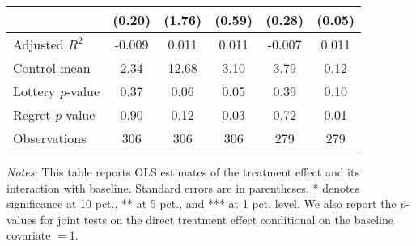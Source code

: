 \begin{table}[htbp]
{\begin{threeparttable}
\begin{tabular}{l*{5}{c}}
                &   (0.20)         &   (1.76)         &   (0.59)         &   (0.28)         &   (0.05)         \\
\midrule
Adjusted \(R^{2}\)&   -0.009         &    0.011         &    0.011         &   -0.007         &    0.011         \\
Control mean    &     2.34         &    12.68         &     3.10         &     3.79         &     0.12         \\
Lottery \emph{p}-value&     0.37         &     0.06         &     0.05         &     0.39         &     0.10         \\
Regret \emph{p}-value&     0.90         &     0.12         &     0.03         &     0.72         &     0.01         \\
Observations    &      306         &      306         &      306         &      279         &      279         \\
\bottomrule \end{tabular} \begin{tablenotes}[flushleft] \footnotesize \item \emph{Notes:} This table reports OLS estimates of the treatment effect and its interaction with baseline. Standard errors are in parentheses. * denotes significance at 10 pct., ** at 5 pct., and *** at 1 pct. level. We also report the \(p\)-values for joint tests on the direct treatment effect conditional on the baseline covariate $= 1$. \end{tablenotes} \end{threeparttable} } \end{table}
